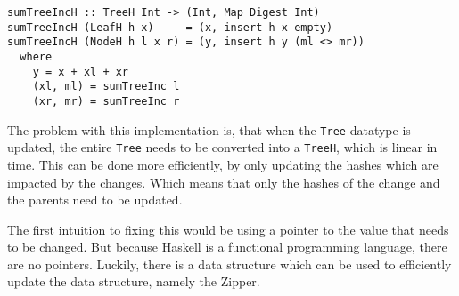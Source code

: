 \begin{verbatim}
sumTreeIncH :: TreeH Int -> (Int, Map Digest Int)
sumTreeIncH (LeafH h x)     = (x, insert h x empty)
sumTreeIncH (NodeH h l x r) = (y, insert h y (ml <> mr))
  where
    y = x + xl + xr
    (xl, ml) = sumTreeInc l
    (xr, mr) = sumTreeInc r
\end{verbatim}

The problem with this implementation is, that when the \texttt{Tree} datatype is updated, the entire \texttt{Tree} needs to be converted into a \texttt{TreeH}, which is linear in time. This can be done more efficiently, by only updating the hashes which are impacted by the changes. Which means that only the hashes of the change and the parents need to be updated. 

The first intuition to fixing this would be using a pointer to the value that needs to be changed. But because Haskell is a functional programming language, there are no pointers. Luckily, there is a data structure which can be used to efficiently update the data structure, namely the Zipper\cite{huet1997zipper}.

